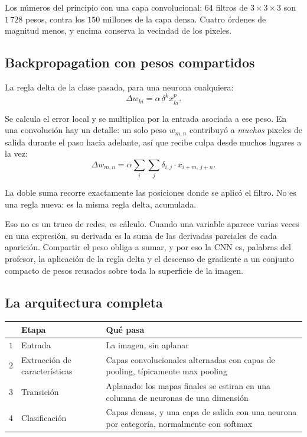 \documentclass[11pt,letterpaper]{article}
\begin{document}
\begin{idea}
  Los números del principio con una capa convolucional: $64$ filtros
  de $3 \times 3 \times 3$ son $1\,728$ pesos, contra los $150$
  millones de la capa densa. Cuatro órdenes de magnitud menos, y
  encima conserva la vecindad de los pixeles.
\end{idea}

\subsection*{Backpropagation con pesos compartidos}

La regla delta de la clase pasada, para una neurona cualquiera:
\[
    \Delta w_{ki} = \alpha\, \delta^k x_{ki}^p .
\]

Se calcula el error local y se multiplica por la entrada asociada a
ese peso. En una convolución hay un detalle: un solo peso $w_{m,n}$
contribuyó a \emph{muchos} pixeles de salida durante el paso hacia
adelante, así que recibe culpa desde muchos lugares a la vez:
\[
    \Delta w_{m,n} = \alpha \sum_i \sum_j
                     \delta_{i,j} \cdot x_{i+m,\, j+n} .
\]

La doble suma recorre exactamente las posiciones donde se aplicó el
filtro. No es una regla nueva: es la misma regla delta, acumulada.

\begin{idea}
  Eso no es un truco de redes, es cálculo. Cuando una variable aparece
  varias veces en una expresión, su derivada es la suma de las
  derivadas parciales de cada aparición. Compartir el peso obliga a
  sumar, y por eso la CNN es, palabras del profesor, la aplicación de
  la regla delta y el descenso de gradiente a un conjunto compacto de
  pesos reusados sobre toda la superficie de la imagen.
\end{idea}

\subsection*{La arquitectura completa}

\begin{center}
\begin{tabular}{>{\raggedright\arraybackslash}p{0.6cm}
                >{\raggedright\arraybackslash}p{3.4cm}
                >{\raggedright\arraybackslash}p{9.0cm}}
  \toprule
  & \textbf{Etapa} & \textbf{Qué pasa} \\
  \midrule
  $1$ & Entrada & La imagen, sin aplanar \\
  \addlinespace
  $2$ & Extracción de características &
  Capas convolucionales alternadas con capas de pooling,
  típicamente max pooling \\
  \addlinespace
  $3$ & Transición &
  Aplanado: los mapas finales se estiran en una columna de neuronas de
  una dimensión \\
  \addlinespace
  $4$ & Clasificación &
  Capas densas, y una capa de salida con una neurona por categoría,
  normalmente con softmax \\
  \bottomrule
\end{tabular}
\end{center}
\end{document}
